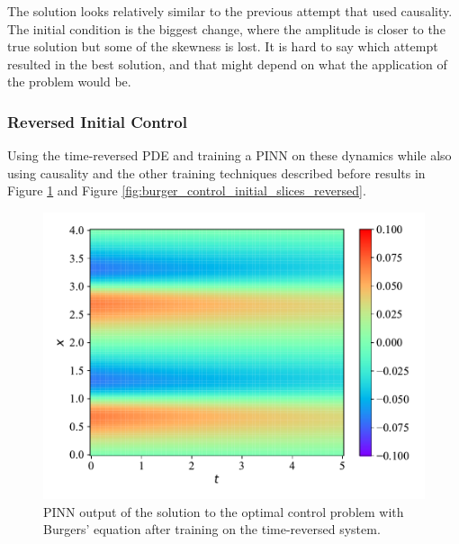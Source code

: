 The solution looks relatively similar to the previous attempt that used causality. The initial condition is the biggest change, where the amplitude is closer to the true solution but some of the skewness is lost. It is hard to say which attempt resulted in the best solution, and that might depend on what the application of the problem would be.

\subsubsection{Reversed Initial Control}

Using the time-reversed PDE and training a PINN on these dynamics while also using causality and the other training techniques described before results in Figure \ref{fig:burger_control_initial_reversed} and Figure \ref{fig:burger_control_initial_slices_reversed}.

\begin{figure}[H]
    \centering
    \includegraphics[width=1.0\linewidth]{Figures/AdvancedExperiments/InitialControlCausal/reversed/burger.pdf}
    \caption{PINN output of the solution to the optimal control problem with Burgers' equation after training on the time-reversed system.}
    \label{fig:burger_control_initial_reversed}
\end{figure}

